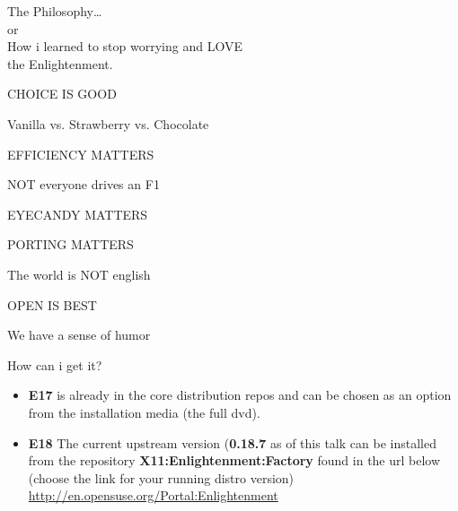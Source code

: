 \documentclass{beamer}
\begin{document}
    \begin{frame}
        \center\huge The Philosophy\ldots \\
        or \\
        How i learned to stop worrying and LOVE\\
        the Enlightenment.
    \end{frame}

    \begin{frame}
        \center CHOICE IS GOOD
    \end{frame}

    \begin{frame}
        \center Vanilla vs. Strawberry vs. Chocolate
    \end{frame}

    \begin{frame}
        \center EFFICIENCY MATTERS
    \end{frame}

    \begin{frame}
        \center NOT everyone drives an F1
    \end{frame}

    \begin{frame}
        \center EYECANDY MATTERS
    \end{frame}

    \begin{frame}
        \center PORTING MATTERS
    \end{frame}

    \begin{frame}
        \center The world is NOT english
    \end{frame}

    \begin{frame}
        \center OPEN IS BEST
    \end{frame}
        
    \begin{frame}
        \center We have a sense of humor
    \end{frame}

    \begin{frame}{How can i get it?}
        \begin{itemize}
            \item {\bf E17} is already in the core distribution repos and can be
                  chosen as an option from the installation media
                  (the full dvd).
            \item {\bf E18} The current upstream version ({\bf 0.18.7} as of
                  this talk can be installed from the repository
                  {\bf X11:Enlightenment:Factory} found in the url below
                  (choose the link for your running distro version)
                  \url{http://en.opensuse.org/Portal:Enlightenment}
        \end{itemize}
    \end{frame}
\end{document}
